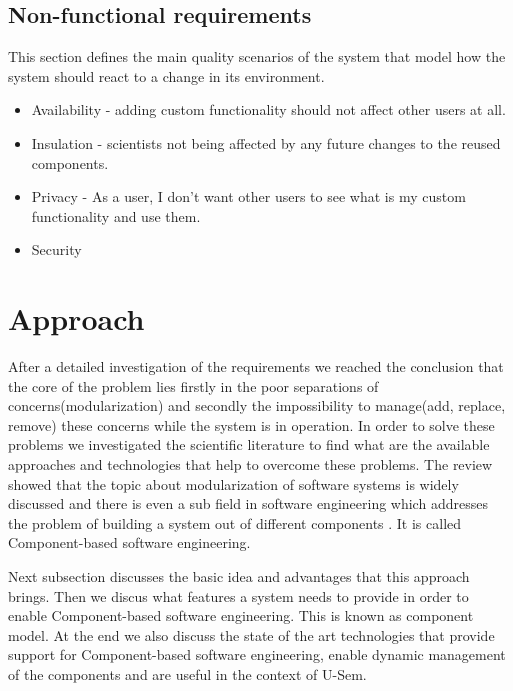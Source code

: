 \subsection{Non-functional requirements}

This section defines the main quality scenarios of the system that model how the system should react to a change in its environment.

\begin{itemize}

	\item Availability - adding custom functionality should not affect other users at all.
	
	\item Insulation - scientists not being affected by any future changes to the reused components.
	
	\item Privacy - As a user, I don't want other users to see what is my custom functionality and use them.
	
	\item Security
	
\end{itemize}

\section{Approach}

After a detailed investigation of the requirements we reached the conclusion that the core of the problem lies firstly in the poor separations of concerns(modularization) and secondly the impossibility to manage(add, replace, remove) these concerns while the system is in operation. In order to solve these problems we investigated the scientific literature to find what are the available approaches and technologies that help to overcome these problems. The review showed that the topic about modularization of software systems is widely discussed and there is even a sub field in software engineering which addresses the problem of building a system out of different components \cite{Jifeng}. It is called Component-based software engineering. 

Next subsection discusses the basic idea and advantages that this approach brings. Then we discus what features a system needs to provide in order to enable Component-based software engineering. This is known as component model. At the end we also discuss the state of the art technologies that provide support for Component-based software engineering, enable dynamic management of the components and are useful in the context of U-Sem. 

